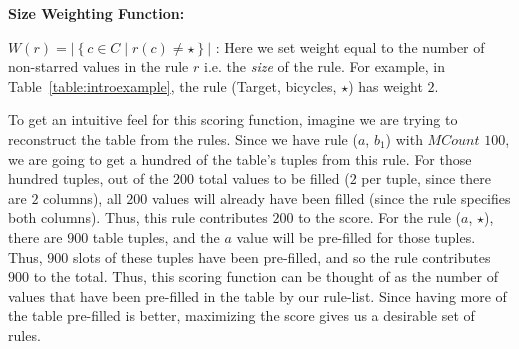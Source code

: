 \documentclass[10pt,journal,compsoc]{IEEEtran}
\newcommand{\stitle}[1]{\vspace{0.5em}\noindent\textbf{#1}}
\newcommand{\eat}[1]{}
\newcommand{\papertext}[1]{#1}
\begin{document}
\stitle{Size Weighting Function:} 

$W(r) = |\left\lbrace c \in C \mid r(c) \neq \star \right\rbrace |$ : 
Here we set weight equal to the number of non-starred values in the rule $r$ i.e. the {\em size} of the rule. For example, in Table~\ref{table:introexample}, the rule (Target, bicycles, $\star$) has weight $2$.

\papertext{To get an intuitive feel for this scoring function, imagine we are trying to reconstruct the table from the rules. Since we have rule ($a$, $b_1$) with $MCount$ $100$, we are going to get a hundred of the table's tuples from this rule. For those hundred tuples, out of the $200$ total values to be filled ($2$ per tuple, since there are $2$ columns), all $200$ values will already have been filled (since the rule specifies both columns). Thus, this rule contributes $200$ to the score. For the rule ($a$, $\star$), there are $900$ table tuples, and the $a$ value will be pre-filled for those tuples. Thus, $900$ slots of these tuples have been pre-filled, and so the rule contributes $900$ to the total. Thus, this scoring function can be thought of as the number of values that have been pre-filled in the table by our rule-list. Since having more of the table pre-filled is better, maximizing the score gives us a desirable set of rules.}
\end{document}
